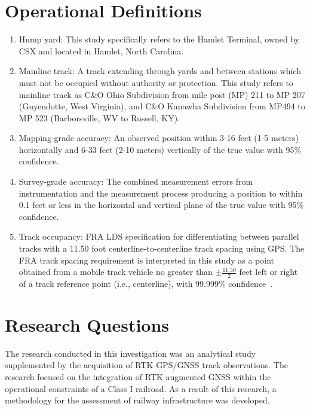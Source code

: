 \section{Operational Definitions}

\begin{enumerate}[1)]
\firmlist

	\item Hump yard: This study specifically refers to the Hamlet Terminal, owned by CSX and located in Hamlet, North Carolina.

	\item Mainline track: A track extending through yards and between stations which must not be occupied without authority or protection. This study refers to mainline track as C\&O Ohio Subdivision from mile post (MP) 211 to MP 207 (Guyendotte, West Virginia), and C\&O Kanawha Subdivision from MP494 to MP 523 (Barborsville, WV to Russell, KY).

	\item Mapping-grade accuracy: An observed position within 3-16 feet (1-5 meters)  horizontally and 6-33 feet (2-10 meters) vertically of the true value with 95\% confidence.

	\item Survey-grade accuracy: The combined measurement errors from instrumentation and the measurement process producing a position to within 0.1 feet or less in the horizontal and vertical plane of the true value with 95\% confidence.

	\item Track occupancy: FRA LDS specification for differentiating between parallel tracks with a 11.50 foot centerline-to-centerline track spacing using GPS. The FRA track spacing requirement is interpreted in this study as a point obtained from a mobile track vehicle no greater than $\pm\frac{11.50}{2}$ feet left or right of a track reference point (i.e., centerline), with 99.999\% confidence~\cite[pp.6-7]{1995FRADiffe}.

\end{enumerate}

\section{Research Questions}
The research conducted in this investigation was an analytical study
supplemented by the acquisition of RTK GPS/GNSS track observations. The research focused on the integration of RTK augmented GNSS within the operational constraints of a Class I railroad. As a result of this research, a methodology for the assessment of railway infrastructure was developed.

